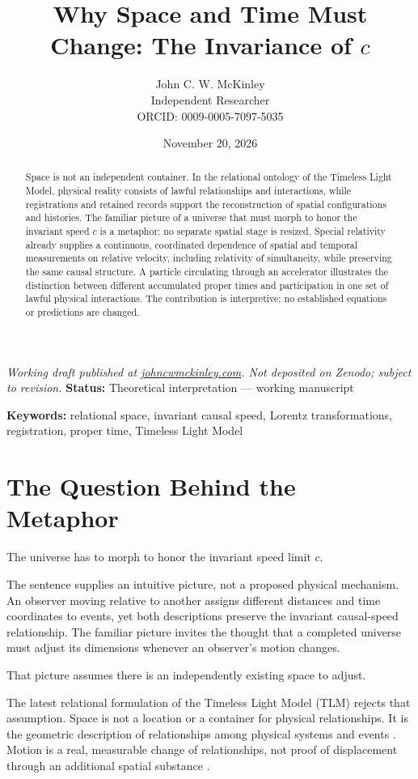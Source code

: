 \documentclass[11pt]{article}
\title{Why Space and Time Must Change: The Invariance of $c$}
\author{John C. W. McKinley\\Independent Researcher\\ORCID: 0009-0005-7097-5035}
\date{November 20, 2026}
\begin{document}
\maketitle
\noindent\footnotesize\textit{Working draft published at \href{https://johncwmckinley.com}{johncwmckinley.com}. Not deposited on Zenodo; subject to revision.}\normalsize
\noindent\textbf{Status:} Theoretical interpretation --- working manuscript

\begin{abstract}
Space is not an independent container. In the relational ontology of the Timeless Light Model, physical reality consists of lawful relationships and interactions, while registrations and retained records support the reconstruction of spatial configurations and histories. The familiar picture of a universe that must morph to honor the invariant speed $c$ is a metaphor: no separate spatial stage is resized. Special relativity already supplies a continuous, coordinated dependence of spatial and temporal measurements on relative velocity, including relativity of simultaneity, while preserving the same causal structure. A particle circulating through an accelerator illustrates the distinction between different accumulated proper times and participation in one set of lawful physical interactions. The contribution is interpretive; no established equations or predictions are changed.
\end{abstract}
\noindent\textbf{Keywords:} relational space, invariant causal speed, Lorentz transformations, registration, proper time, Timeless Light Model

\section{The Question Behind the Metaphor}

The universe has to morph to honor the invariant speed limit $c$.

The sentence supplies an intuitive picture, not a proposed physical mechanism. An observer moving relative to another assigns different distances and time coordinates to events, yet both descriptions preserve the invariant causal-speed relationship. The familiar picture invites the thought that a completed universe must adjust its dimensions whenever an observer's motion changes.

That picture assumes there is an independently existing space to adjust.

The latest relational formulation of the Timeless Light Model (TLM) rejects that assumption. Space is not a location or a container for physical relationships. It is the geometric description of relationships among physical systems and events \cite{mckinleylocation2026,mckinleybox2026}. Motion is a real, measurable change of relationships, not proof of displacement through an additional spatial substance \cite{mckinleymotion2026}.
\end{document}
